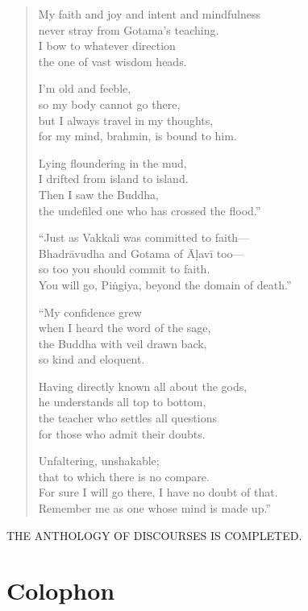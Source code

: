 \documentclass[12pt,openany]{book}%
\newcommand*{\scendbook}[1]{\begin{center}\uppercase{#1}\end{center}}
\let\oldbackmatter\backmatter
\renewcommand{\backmatter}{%
\chapterfont{\setstretch{.85}\normalfont\centering}%
\sectionfont{\setstretch{.85}\Semiboldsubheadfont}%
\oldbackmatter}
\begin{document}
\begin{verse}
My faith and joy and intent and mindfulness \\
never stray from Gotama’s teaching. \\
I bow to whatever direction \\
the one of vast wisdom heads. 

I’m old and feeble, \\
so my body cannot go there, \\
but I always travel in my thoughts, \\
for my mind, brahmin, is bound to him. 

Lying floundering in the mud, \\
I drifted from island to island. \\
Then I saw the Buddha, \\
the undefiled one who has crossed the flood.” 

“Just as Vakkali was committed to faith—\\
\textsanskrit{Bhadrāvudha} and Gotama of \textsanskrit{Āḷavī} too—\\
so too you should commit to faith. \\
You will go, \textsanskrit{Piṅgiya}, beyond the domain of death.” 

“My confidence grew \\
when I heard the word of the sage, \\
the Buddha with veil drawn back, \\
so kind and eloquent. 

Having directly known all about the gods, \\
he understands all top to bottom, \\
the teacher who settles all questions \\
for those who admit their doubts. 

Unfaltering, unshakable; \\
that to which there is no compare. \\
For sure I will go there, I have no doubt of that. \\
Remember me as one whose mind is made up.” 

%
\end{verse}

\scendbook{The Anthology of Discourses is completed. }

%
\backmatter%
%
\chapter*{Colophon}
\end{document}
